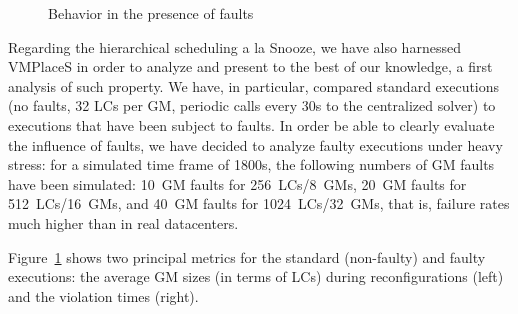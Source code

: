 

\begin{figure}[bp]
\subcapcentertrue
{}
\caption{Behavior in the presence of faults}
\label{fig:snoozeFaults}
\end{figure}



Regarding the hierarchical scheduling a la Snooze, we have also
harnessed VMPlaceS in order to analyze and present to the best of our
knowledge, a first analysis of such property.
We have, in particular, compared standard executions (no faults, 32
LCs per GM, periodic calls every 30s to the centralized solver) to
executions that have been subject to faults. In order be able to
clearly evaluate the influence of faults, we have decided to analyze
faulty executions under heavy stress: for a simulated time frame of
1800s, the following numbers of GM faults have been simulated: 10~GM
faults for 256~LCs/8~GMs, 20~GM faults for 512~LCs/16~GMs, and 40~GM
faults for 1024~LCs/32~GMs, that is, failure rates much higher than in
real datacenters.

Figure~\ref{fig:snoozeFaults} shows two principal metrics for the
standard (non-faulty) and faulty executions: the average GM sizes (in
terms of LCs) during reconfigurations (left) and the violation times
(right).

